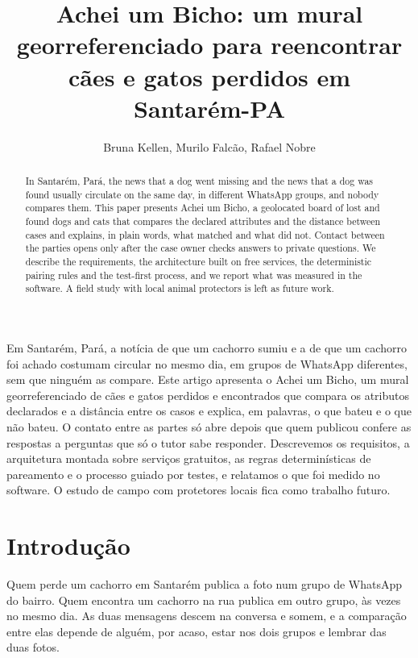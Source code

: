 \documentclass[12pt]{article}
\title{Achei um Bicho: um mural georreferenciado para reencontrar\\ cães e gatos perdidos em Santarém-PA}
\author{Bruna Kellen\inst{1}, Murilo Falcão\inst{1}, Rafael Nobre\inst{1}}
\begin{document}
\maketitle

\begin{abstract}
  In Santarém, Pará, the news that a dog went missing and the news that a dog
  was found usually circulate on the same day, in different WhatsApp groups,
  and nobody compares them. This paper presents Achei um Bicho, a geolocated
  board of lost and found dogs and cats that compares the declared attributes
  and the distance between cases and explains, in plain words, what matched and
  what did not. Contact between the parties opens only after the case owner
  checks answers to private questions. We describe the requirements, the
  architecture built on free services, the deterministic pairing rules and the
  test-first process, and we report what was measured in the software. A field
  study with local animal protectors is left as future work.
\end{abstract}

\begin{resumo}
  Em Santarém, Pará, a notícia de que um cachorro sumiu e a de que um cachorro
  foi achado costumam circular no mesmo dia, em grupos de WhatsApp diferentes,
  sem que ninguém as compare. Este artigo apresenta o Achei um Bicho, um mural
  georreferenciado de cães e gatos perdidos e encontrados que compara os
  atributos declarados e a distância entre os casos e explica, em palavras, o
  que bateu e o que não bateu. O contato entre as partes só abre depois que
  quem publicou confere as respostas a perguntas que só o tutor sabe responder.
  Descrevemos os requisitos, a arquitetura montada sobre serviços gratuitos, as
  regras determinísticas de pareamento e o processo guiado por testes, e
  relatamos o que foi medido no software. O estudo de campo com protetores
  locais fica como trabalho futuro.
\end{resumo}

\section{Introdução}

Quem perde um cachorro em Santarém publica a foto num grupo de WhatsApp do
bairro. Quem encontra um cachorro na rua publica em outro grupo, às vezes no
mesmo dia. As duas mensagens descem na conversa e somem, e a comparação entre
elas depende de alguém, por acaso, estar nos dois grupos e lembrar das duas
fotos.
\end{document}
